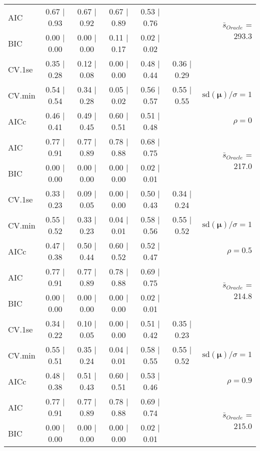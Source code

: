 \begin{table}
\begin{center}
\begin{tabular}{l*{5}{c}|r}
AIC & 0.67 $\mid$ 0.93 & 0.67 $\mid$ 0.92 & 0.67 $\mid$ 0.89 & 0.53 $\mid$ 0.76 & &  \multirow{2}{*}{$\bar{s}_{Oracle}$ = 293.3} \\
BIC & 0.00 $\mid$ 0.00 & 0.00 $\mid$ 0.00 & 0.11 $\mid$ 0.17 & 0.02 $\mid$ 0.02 & &  \\
 \hline 
CV.1se & 0.35 $\mid$ 0.28 & 0.12 $\mid$ 0.08 & 0.00 $\mid$ 0.00 & 0.48 $\mid$ 0.44 & 0.36 $\mid$ 0.29 & \\
CV.min & 0.54 $\mid$ 0.54 & 0.34 $\mid$ 0.28 & 0.05 $\mid$ 0.02 & 0.56 $\mid$ 0.57 & 0.55 $\mid$ 0.55 &  $\mathrm{sd}(\mathbf{\mu})/\sigma=1$ \\
AICc & 0.46 $\mid$ 0.41 & 0.49 $\mid$ 0.45 & 0.60 $\mid$ 0.51 & 0.51 $\mid$ 0.48 & & $\rho=0$ \\
AIC & 0.77 $\mid$ 0.91 & 0.77 $\mid$ 0.89 & 0.78 $\mid$ 0.88 & 0.68 $\mid$ 0.75 & &  \multirow{2}{*}{$\bar{s}_{Oracle}$ = 217.0} \\
BIC & 0.00 $\mid$ 0.00 & 0.00 $\mid$ 0.00 & 0.00 $\mid$ 0.00 & 0.02 $\mid$ 0.01 & &  \\
 \hline 
CV.1se & 0.33 $\mid$ 0.23 & 0.09 $\mid$ 0.05 & 0.00 $\mid$ 0.00 & 0.50 $\mid$ 0.43 & 0.34 $\mid$ 0.24 & \\
CV.min & 0.55 $\mid$ 0.52 & 0.33 $\mid$ 0.23 & 0.04 $\mid$ 0.01 & 0.58 $\mid$ 0.56 & 0.55 $\mid$ 0.52 &  $\mathrm{sd}(\mathbf{\mu})/\sigma=1$ \\
AICc & 0.47 $\mid$ 0.38 & 0.50 $\mid$ 0.44 & 0.60 $\mid$ 0.52 & 0.52 $\mid$ 0.47 & & $\rho=0.5$ \\
AIC & 0.77 $\mid$ 0.91 & 0.77 $\mid$ 0.89 & 0.78 $\mid$ 0.88 & 0.69 $\mid$ 0.75 & &  \multirow{2}{*}{$\bar{s}_{Oracle}$ = 214.8} \\
BIC & 0.00 $\mid$ 0.00 & 0.00 $\mid$ 0.00 & 0.00 $\mid$ 0.00 & 0.02 $\mid$ 0.01 & &  \\
 \hline 
CV.1se & 0.34 $\mid$ 0.22 & 0.10 $\mid$ 0.05 & 0.00 $\mid$ 0.00 & 0.51 $\mid$ 0.42 & 0.35 $\mid$ 0.23 & \\
CV.min & 0.55 $\mid$ 0.51 & 0.35 $\mid$ 0.24 & 0.04 $\mid$ 0.01 & 0.58 $\mid$ 0.55 & 0.55 $\mid$ 0.52 &  $\mathrm{sd}(\mathbf{\mu})/\sigma=1$ \\
AICc & 0.48 $\mid$ 0.38 & 0.51 $\mid$ 0.43 & 0.60 $\mid$ 0.51 & 0.53 $\mid$ 0.46 & & $\rho=0.9$ \\
AIC & 0.77 $\mid$ 0.91 & 0.77 $\mid$ 0.89 & 0.78 $\mid$ 0.88 & 0.69 $\mid$ 0.74 & &  \multirow{2}{*}{$\bar{s}_{Oracle}$ = 215.0} \\
BIC & 0.00 $\mid$ 0.00 & 0.00 $\mid$ 0.00 & 0.00 $\mid$ 0.00 & 0.02 $\mid$ 0.01 & &  \\

\end{tabular}
\end{center}
\end{table}
